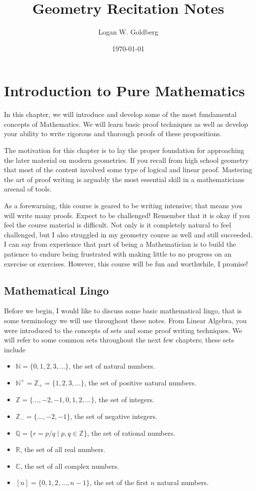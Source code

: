 \documentclass[12pt]{book}
\title{Geometry Recitation Notes}
\author{Logan W. Goldberg}
\date{\today}
\def\C{{\mathbb{C}}}
\def\N{{\mathbb{N}}}
\def\Q{{\mathbb{Q}}}
\def\R{{\mathbb{R}}}
\def\Z{{\mathbb{Z}}}
\begin{document}
\maketitle
\tableofcontents

\chapter{Introduction to Pure Mathematics}

In this chapter, we will introduce and develop some of the most fundamental concepts of Mathematics. We will learn basic proof techniques as well as develop your ability to write rigorous and thorough proofs of these propositions. 

	The motivation for this chapter is to lay the proper foundation for approaching the later material on modern geometries. If you recall from high school geometry that most of the content involved some type of logical and linear proof. Mastering the art of proof writing is arguably the most essential skill in a mathematicians arsenal of tools. 

	As a forewarning, this course is geared to be writing intensive; that means you will write many proofs. Expect to be challenged! Remember that it is okay if you feel the course material is difficult. Not only is it completely natural to feel challenged, but I also struggled in my geometry course as well and still succeeded. I can say from experience that part of being a Mathematician is to build the patience to endure being frustrated with making little to no progress on an exercise or exercises. However, this course will be fun and worthwhile, I promise!

\section{Mathematical Lingo}
Before we begin, I would like to discuss some basic mathematical lingo, that is some terminology we will use throughout these notes. From Linear Algebra, you were introduced to the concepts of sets and some proof writing techniques. We will refer to some common sets throughout the next few chapters; these sets include
\begin{itemize}
\item $\N=\{0,1,2,3,\ldots\}$, the set of natural numbers.
\item $\N^+=\Z_+=\{1,2,3,\ldots\}$, the set of positive natural numbers.
\item $\Z=\{\ldots,-2,-1,0,1,2,\ldots\}$, the set of integers.
\item $\Z_-=\{\ldots,-2,-1\}$, the set of negative integers.
\item $\Q=\{r=p/q\mid p,q\in\Z\}$, the set of rational numbers.
\item $\R$, the set of all real numbers.
\item $\C$, the set of all complex numbers.
\item $[n]=\{0,1,2,\ldots,n-1\}$, the set of the first $n$ natural numbers.
\end{itemize}
\end{document}
